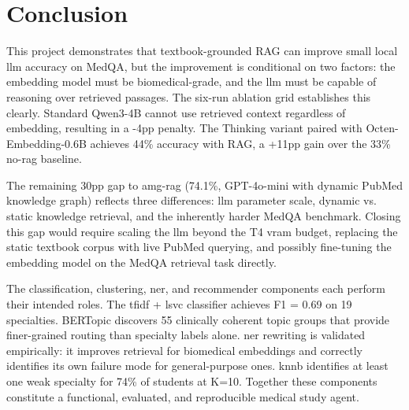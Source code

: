 \chapter{Conclusion}

This project demonstrates that textbook-grounded RAG can improve small local \gls{llm} accuracy on MedQA, but the improvement is conditional on two factors: the embedding model must be biomedical-grade, and the \gls{llm} must be capable of reasoning over retrieved passages. The six-run ablation grid establishes this clearly. Standard Qwen3-4B cannot use retrieved context regardless of embedding, resulting in a -4\gls{pp} penalty. The Thinking variant paired with Octen-Embedding-0.6B achieves 44\% accuracy with RAG, a +11\gls{pp} gain over the 33\% no-\gls{rag} baseline. 

The remaining 30\gls{pp} gap to \gls{amg-rag} (74.1\%, GPT-4o-mini with dynamic PubMed knowledge graph) reflects three differences: \gls{llm} parameter scale, dynamic vs. static knowledge retrieval, and the inherently harder MedQA benchmark. Closing this gap would require scaling the \gls{llm} beyond the T4 \gls{vram} budget, replacing the static textbook corpus with live PubMed querying, and possibly fine-tuning the embedding model on the MedQA retrieval task directly. 

The classification, clustering, \gls{ner}, and recommender components each perform their intended roles. The \gls{tfidf} + \gls{lsvc} classifier achieves F1 = 0.69 on 19 specialties. BERTopic discovers 55 clinically coherent topic groups that provide finer-grained routing than specialty labels alone. \gls{ner} rewriting is validated empirically: it improves retrieval for biomedical embeddings and correctly identifies its own failure mode for general-purpose ones. \gls{knnb} identifies at least one weak specialty for 74\% of students at K=10. Together these components constitute a functional, evaluated, and reproducible medical study agent.